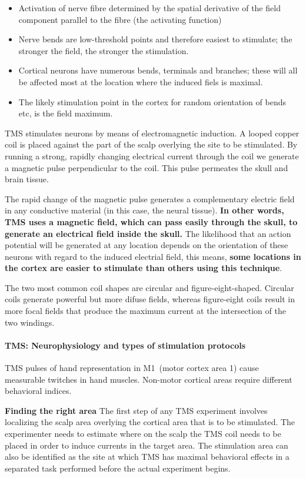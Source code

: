 \documentclass[12pt,article,oneside,a4paper]{memoir}
\begin{document}
\begin{itemize}
\item Activation of nerve fibre determined by the spatial derivative of the
field component parallel to the fibre (the activating function)
\item Nerve bends are low-threshold points and therefore easiest to stimulate;
the stronger the field, the stronger the stimulation.
\item Cortical neurons have numerous bends, terminals and branches; these will
all be affected most at the location where the induced fiels is maximal.
\item The likely stimulation point in the cortex for random orientation of
bends etc, is the field maximum.
\end{itemize}

TMS stimulates neurons by means of electromagnetic induction. A
looped copper coil is placed against the part of the scalp overlying the site
to be stimulated. By running a strong, rapidly changing electrical current
through the coil we generate a magnetic pulse perpendicular to the coil. This
pulse permeates the skull and brain tissue.

The rapid change of the magnetic pulse generates a complementary electric field
in any conductive material (in this case, the neural tissue). \textbf{In other
words, TMS uses a magnetic field, which can pass easily through the skull, to
generate an electrical field inside  the skull.}
The likelihood that an action potential will be generated at any location
depends on the orientation of these neurons with regard to the induced
electrial field, this means, \textbf{some locations in the cortex are easier to
stimulate than others using this technique}.

The two most common coil shapes are circular and figure-eight-shaped. Circular
coils generate powerful but more difuse fields, whereas figure-eight coils
result in more focal fields that produce the maximum current at the
intersection of the two windings.

\paragraph{TMS: Neurophysiology and types of stimulation protocols}
TMS pulses of hand representation in M1~(motor cortex area 1) cause measurable
twitches in hand muscles. Non-motor cortical areas require different behavioral
indices.

\textbf{Finding the right area} The first step of any TMS experiment involves
localizing the scalp area overlying the cortical area that is to be stimulated.
The experimenter needs to estimate where on the scalp the TMS coil needs to be
placed in order to induce currents in the target area. The stimulation area can
also be identified as the site at which TMS has maximal behavioral effects in a
separated task performed before the actual experiment begins.
\end{document}
